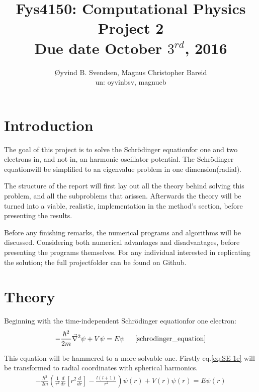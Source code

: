 \documentclass[11pt,a4paper,notitlepage]{article}
\title{\normalsize Fys4150: Computational Physics \\
\vspace{10mm}
\huge Project 2\\
\vspace{10mm}
\normalsize Due date {\bf October $3^{rd}$, 2016}}
\author{Øyvind B. Svendsen, Magnus Christopher Bareid \\ un: oyvinbsv, magnucb}
\newcommand{\SE}{Schr\"odinger equation}
\newcommand{\laplacian}{\vec{\nabla}^2}
\begin{document}
\noindent
\maketitle
\vspace{10mm}
\begin{abstract}
\end{abstract}

\begin{center}
\end{center}

\newpage
\tableofcontents

\newpage
\section{Introduction}
The goal of this project is to solve the \SE for one and two electrons in, and not in, an harmonic oscillator potential. The \SE will be simplified to an eigenvalue problem in one dimension(radial). 

The structure of the report will first lay out all the theory behind solving this problem, and all the subproblems that arissen. Afterwards the theory will be turned into a viable, realistic, implementation in the method's section, before presenting the results. 

Before any finishing remarks, the numerical programs and algorithms will be discussed. Considering both numerical advantages and disadvantages, before presenting the programs themselves. For any individual interested in replicating the solution; the full projectfolder can be found on Github.

\section{Theory}
Beginning with the time-independent \SE for one electron:
\begin{equation} \label{eq:SE 1e}
	-\frac{\hbar^2}{2m}\laplacian \psi + V\psi = E\psi 			
	\indent
	\cite[chapter 4, p.132, eq:4.8]{schrodinger_equation}
\end{equation}

This equation will be hammered to a more solvable one. Firstly eq.\eqref{eq:SE 1e} will be transformed to radial coordinates with spherical harmonics.
\begin{align*}
	-\frac{\hbar^2}{2m}\left( \frac{1}{r^2} \frac{d}{dr}\left [ r^2\frac{d}{dr}\right ] - \frac{l(l+1)}{r^2}\right) \psi(r) + V(r)\psi(r) = E\psi(r)
\end{align*}
\end{document}

